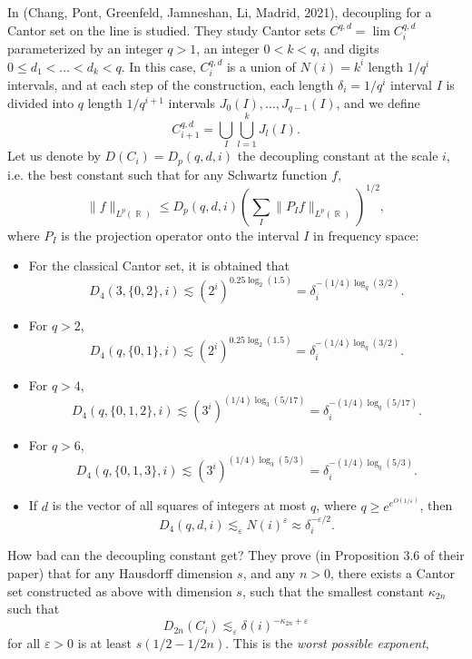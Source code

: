 \documentclass[dvipsnames,letterpaper,12pt]{article}
\numberwithin{equation}{section}
\DeclareMathOperator{\RR}{\mathbb{R}}
\numberwithin{theorem}{section}
\begin{document}
In (Chang, Pont, Greenfeld, Jamneshan, Li, Madrid, 2021), decoupling for a Cantor set on the line is studied. They study Cantor sets $C^{q,d} = \lim C_i^{q,d}$ parameterized by an integer $q > 1$, an integer $0 < k < q$, and digits $0 \leq d_1 < \dots < d_k < q$. In this case, $C^{q,d}_i$ is a union of $N(i) = k^i$ length $1/q^i$ intervals, and at each step of the construction, each length $\delta_i = 1/q^i$ interval $I$ is divided into $q$ length $1/q^{i+1}$ intervals $J_0(I),\dots,J_{q-1}(I)$, and we define
%
\[ C^{q,d}_{i+1} = \bigcup_I \bigcup_{l = 1}^k J_l(I). \]
%
Let us denote by $D(C_i) = D_p(q,d,i)$ the decoupling constant at the scale $i$, i.e. the best constant such that for any Schwartz function $f$,
%
\[ \| f \|_{L^p(\RR)} \leq D_p(q,d,i) \left( \sum_I \| P_I f \|_{L^p(\RR)} \right)^{1/2}, \]
%
where $P_I$ is the projection operator onto the interval $I$ in frequency space:
%
\begin{itemize}
    \item For the classical Cantor set, it is obtained that
    \[ D_4(3,\{ 0, 2 \}, i) \lesssim (2^i)^{0.25 \log_2(1.5)} = \delta_i^{-(1/4) \log_q(3/2)}. \]

    \item For $q > 2$,
    \[ D_4(q,\{ 0, 1 \}, i) \lesssim (2^i)^{0.25 \log_2(1.5)} = \delta_i^{-(1/4) \log_q(3/2)}. \]

    \item For $q > 4$,
    \[ D_4(q, \{ 0, 1, 2 \}, i) \lesssim (3^i)^{(1/4) \log_3(5/17)} = \delta_i^{-(1/4) \log_q(5/17)}. \]

    \item For $q > 6$,
    \[ D_4(q, \{ 0, 1, 3 \}, i) \lesssim (3^i)^{(1/4) \log_3(5/3)} = \delta_i^{-(1/4) \log_q(5/3)}. \]

    \item If $d$ is the vector of all squares of integers at most $q$, where $q \geq e^{e^{O(1/\varepsilon)}}$, then
    \[ D_4(q,d,i) \lesssim_\varepsilon N(i)^\varepsilon \approx \delta_i^{-\varepsilon / 2}. \]
\end{itemize}
%
How bad can the decoupling constant get? They prove (in Proposition 3.6 of their paper) that for any Hausdorff dimension $s$, and any $n > 0$, there exists a Cantor set constructed as above with dimension $s$, such that the smallest constant $\kappa_{2n}$ such that
%
\[ D_{2n}(C_i) \lesssim_\varepsilon \delta(i)^{- \kappa_{2n} + \varepsilon} \]
%
for all $\varepsilon > 0$ is at least $s(1/2 - 1/2n)$. This is the \emph{worst possible exponent}, 
\end{document}
